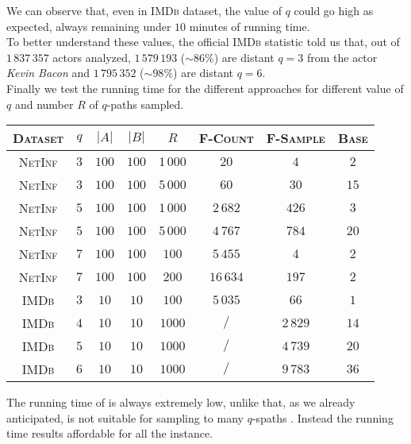 	We can observe that, even in \textsc{IMDb} dataset, the value of $q$ could go high as expected, always remaining under $10$ minutes of running time. \\
	
	To better understand these values, the official \textsc{IMDb} statistic\cite{imdbstat} told us that, out of $1\,837\,357$ actors analyzed, $1\,579\,193$ ($\sim86\%$) are distant $q=3$ from the actor \textit{Kevin Bacon} and $1\,795\,352$ ($\sim98\%$) are distant $q=6$.\\
	
	Finally we test the running time for the different approaches for different value of $q$ and number $R$ of $q$-paths sampled. 
	
	
	\begin{table}[h]
		\centering
		\label{my-label}
		\begin{tabular}{|c|c|c|c|c|c|c|c|}
			\hline
			\textsc{Dataset}       & $q$  & $|A|$ & $|B|$ & $R$ & \textsc{F-Count} & \textsc{F-Sample} & \textsc{Base} \\ \hline \hline
			\textsc{NetInf} & $3$  & $100$ & $100$ & $1\,000$ & $20$ & $4$ & $2$ \\ \hline
			\textsc{NetInf} & $3$  & $100$ & $100$ & $5\,000$ & $60$ & $30$ & $15$ \\ \hline
			\textsc{NetInf} & $5$  & $100$ & $100$ & $1\,000$ & $2\,682$ & $426$ & $3$ \\ \hline
			\textsc{NetInf} & $5$  & $100$ & $100$ & $5\,000$ & $4\,767$ & $784$ & $20$ \\ \hline
			\textsc{NetInf} & $7$  & $100$ & $100$ & $100$ & $5\,455$ & $4$ & $2$ \\ \hline
			\textsc{NetInf} & $7$  & $100$ & $100$ & $200$ & $16\,634$ & $197$ & $2$ \\ \hline \hline
			\textsc{IMDb}   & $3$  & $10$ & $10$ & $100$ & $5\,035$ & $66$ & $1$ \\ \hline
			\textsc{IMDb}   & $4$  & $10$ & $10$ & $1000$ & $/$ & $2\,829$ & $14$ \\ \hline
			\textsc{IMDb}   & $5$  & $10$ & $10$ & $1000$ & $/$ & $4\,739$ & $20$ \\ \hline
			\textsc{IMDb}   & $6$  & $10$ & $10$ & $1000$ & $/$ & $9\,783$ & $36$ \\ \hline
			
		\end{tabular}
	\end{table}
	
	The running time of \base is always extremely low, 
	unlike \fcount that, as we already anticipated, is not suitable for sampling to many $q$-spaths .
	Instead the running time \fsamp results affordable for all the instance. 
	
